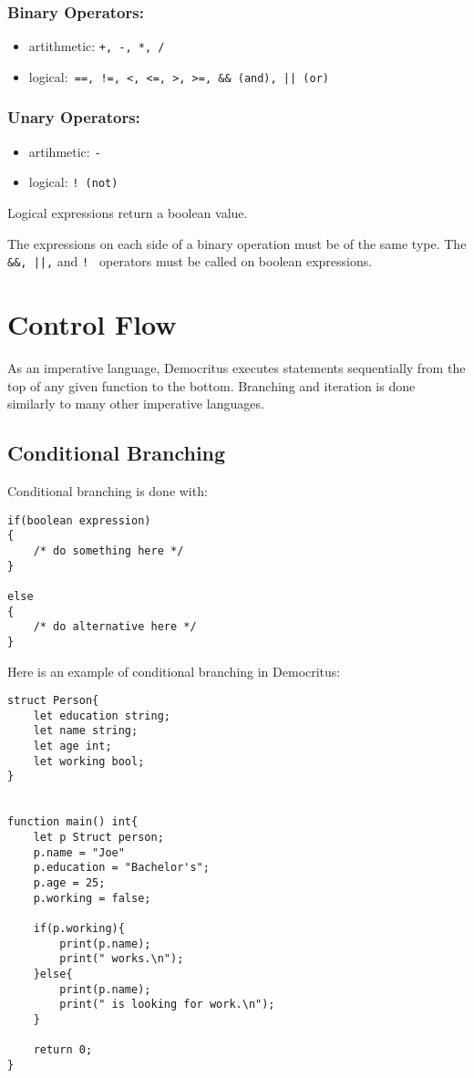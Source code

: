 		\subsubsection{Binary Operators:}
		\begin{itemize}
			\item artithmetic: \texttt{+, -, *, /}
			\item logical:\verb^ ==, !=, <, <=, >, >=, && (and), || (or) ^ 
		\end{itemize}

		\subsubsection{Unary Operators:}
		\begin{itemize}
			\item artihmetic: \texttt{-}
			\item logical: \texttt{! (not)}
		\end{itemize}

		\noindent
		Logical expressions return a boolean value.

		\medskip \noindent
		The expressions on each side of a binary operation must be of the same type. The \verb^ &&, ||,^ and \verb^! ^ operators must be called on boolean expressions.


\section{Control Flow}
	As an imperative language, Democritus executes statements sequentially from the top of any given function to the bottom. Branching and iteration is done similarly to many other imperative languages.

	\subsection{Conditional Branching}
		Conditional branching is done with:

		\begin{lstlisting}
if(boolean expression) 
{ 
	/* do something here */
}

else
{
	/* do alternative here */
}
		\end{lstlisting}
	
		\medskip \noindent
		Here is an example of conditional branching in Democritus:

		\begin{lstlisting}
struct Person{
	let education string;
	let name string;
	let age int;
	let working bool;
}


function main() int{
	let p Struct person;
	p.name = "Joe"
	p.education = "Bachelor's";
	p.age = 25;
	p.working = false;

	if(p.working){
		print(p.name);
		print(" works.\n");
	}else{
		print(p.name);
		print(" is looking for work.\n");
	}

	return 0;
}
		\end{lstlisting}


